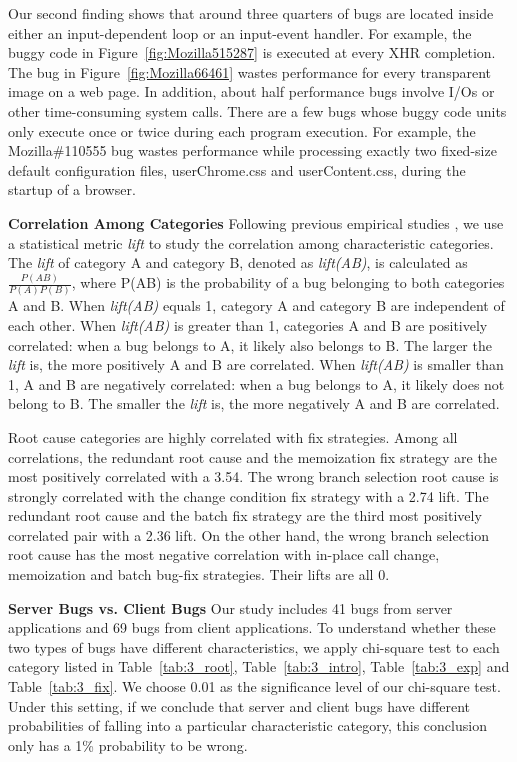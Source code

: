 Our second finding shows that
around three quarters of bugs are
located inside either an input-dependent loop or an input-event handler. 
For example, the buggy code in Figure~\ref{fig:Mozilla515287}
is executed at every XHR completion.
The bug in Figure~\ref{fig:Mozilla66461} wastes performance
for every transparent image on a web page.
In addition, about half performance bugs involve I/Os or 
other time-consuming system calls. 
There are a few bugs whose buggy code units only execute once or twice
during each program execution. For example, the Mozilla\#110555 bug wastes
performance while processing exactly two fixed-size
default configuration files,
userChrome.css and userContent.css, during the startup of a browser.

{\bf Correlation Among Categories}
Following previous empirical studies \citep{LiASID06}, we use a statistical 
metric {\it lift} to study the correlation among characteristic categories.
The {\it lift} of category A and category B, denoted as {\it lift(AB)}, 
    is calculated 
as $\frac{P(AB)}{P(A)P(B)}$, where P(AB) is the probability of a bug belonging 
to both categories A and B. When {\it lift(AB)} equals 1,   
category A and category B are independent of each other.
When {\it lift(AB)} is greater than 1, categories A and B are 
positively correlated: when a bug belongs to A, it likely
also belongs to B. The larger the {\it lift} is, the more positively A and B
are correlated.
When {\it lift(AB)} is smaller than 1, A and B are negatively
correlated: when a bug belongs to A, it likely does not belong to B.
The smaller the {\it lift} is, the more negatively A and B are correlated.

Root cause categories are highly correlated with fix strategies. 
Among all correlations, the redundant root cause and the memoization fix strategy are 
the most positively correlated with a 3.54. 
The wrong branch selection root cause is strongly correlated with the change condition 
fix strategy with a 2.74 lift. The redundant root cause and the batch fix strategy are the third 
most positively correlated pair with a 2.36 lift. 
On the other hand, the wrong branch selection root cause has the most negative correlation 
with in-place call change, memoization and batch bug-fix strategies. 
Their lifts are all 0. 



{\bf Server Bugs vs. Client Bugs}
Our study includes 41 bugs from server applications and 69 bugs from client 
applications. To understand whether these two types of bugs have different 
characteristics, we apply chi-square test
\citep{chisquared} to each
category listed in Table~\ref{tab:3_root}, Table~\ref{tab:3_intro}, Table~\ref{tab:3_exp} and Table~\ref{tab:3_fix}.
We choose 0.01 as the significance level of our chi-square test. 
Under this setting, if we conclude that server and client bugs have different
probabilities of falling into a particular characteristic category, 
this conclusion only has a 1\% probability to be wrong. 

